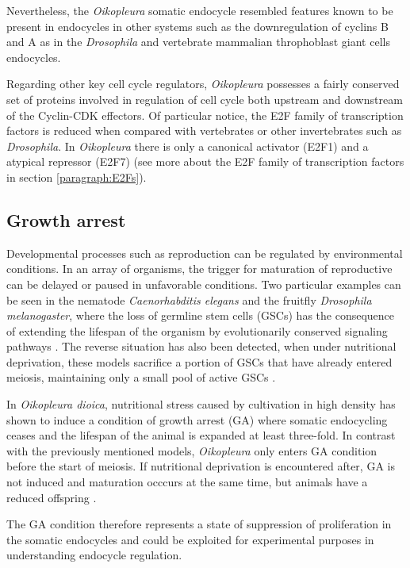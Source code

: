 \documentclass[11pt,twoside,a4paper]{report}
\begin{document}
		Nevertheless, the \textit{Oikopleura} somatic endocycle resembled features known to be present in endocycles in other systems such as the downregulation of cyclins B and A as in the \textit{Drosophila} and vertebrate mammalian throphoblast giant cells endocycles.
		
		Regarding other key cell cycle regulators, \textit{Oikopleura} possesses a fairly conserved set of proteins involved in regulation of cell cycle both upstream and downstream of the Cyclin-CDK effectors. Of particular notice, the E2F family of transcription factors is reduced when compared with vertebrates or other invertebrates such as \textit{Drosophila}. In \textit{Oikopleura} there is only a canonical activator (E2F1) and a atypical repressor (E2F7) (see more about the E2F family of transcription factors in section \ref{paragraph:E2Fs}).
		
		\subsection{Growth arrest}
		\label{subsection:Growth_arrest}
		Developmental processes such as reproduction can be regulated by environmental conditions. In an array of organisms, the trigger for maturation of reproductive can be delayed or paused in unfavorable conditions. Two particular examples can be seen in the nematode \textit{Caenorhabditis elegans} and the fruitfly \textit{Drosophila melanogaster}, where the loss of germline stem cells (GSCs) has the consequence of extending the lifespan of the organism by evolutionarily conserved signaling pathways \cite{Kenyon2010}. The reverse situation has also been detected, when under nutritional deprivation, these models sacrifice a portion of GSCs that have already entered meiosis, maintaining only a small pool of active GSCs \cite{Subramaniam2014}.

		In \textit{Oikopleura dioica}, nutritional stress caused by cultivation in high density has shown to induce a condition of growth arrest (GA) where somatic endocycling ceases 	and the lifespan of the animal is expanded at least three-fold. In contrast with the previously mentioned models, \textit{Oikopleura} only enters GA condition before the start of meiosis. If nutritional deprivation is encountered after, GA is not induced and maturation occcurs at the same time, but animals have a reduced offspring \cite{Subramaniam2014}.
		
		The GA condition therefore represents a state of suppression of proliferation in the somatic endocycles and could be exploited for experimental purposes in understanding endocycle regulation.
	
\end{document}

